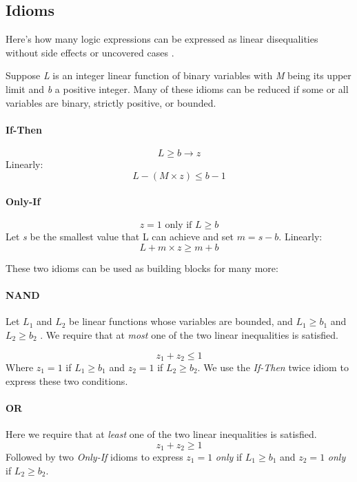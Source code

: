 \subsection{Idioms}

Here's how many logic expressions can be expressed as linear disequalities without side effects or uncovered cases \cite{gusfieldilp}.

Suppose \textit{L} is an integer linear function of binary variables with \textit{M} being its upper limit and \textit{b} a positive integer. Many of these idioms can be reduced if some or all variables are binary, strictly positive, or bounded.

\paragraph{If-Then}

$$ L \geq b \rightarrow z$$
Linearly:
$$ L - (M \times z) \leq  b - 1$$


\paragraph{Only-If}

$$ \text{$z = 1$ only if $L \geq b$}$$
Let \textit{s} be the smallest value that L can achieve and set $m = s - b$. Linearly:
$$ L + m \times z \geq m + b$$

These two idioms can be used as building blocks for many more:

\paragraph{NAND \\} 

Let $L_1$ and $L_2$ be linear functions whose variables are bounded, and $L_1 \geq b_1$ and $L_2 \geq b_2$ . We require that
at \textit{most} one of the two linear inequalities is satisfied.

$$z_1 + z_2 \leq 1 $$
Where $z_1 = 1$ if $L_1 \geq b_1$ and $z_2 = 1$ if $L_2 \geq b_2$. We use the \textit{If-Then} twice idiom to express these two conditions.

\paragraph{OR \\}
Here we require that at \textit{least} one of the two linear inequalities is satisfied.
$$z_1 + z_2 \geq 1 $$
Followed by two \textit{Only-If} idioms to express $z_1 = 1$ \textit{only} if $L_1 \geq b_1$ and $z_2 = 1$ \textit{only} if $L_2 \geq b_2$.


